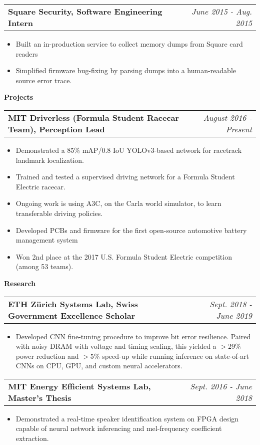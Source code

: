 \documentclass[letterpaper,11pt]{article}
\makeatletter
\newcommand{\resitem}[1]{\item[--] #1 \vspace{-4pt}}
\newcommand{\ressubheadingtwo}[2] {
\begin{tabular*}{7in}{l@{\extracolsep{\fill}}r}
	\textbf{#1} & \textit{#2} \\
\end{tabular*}\vspace{-6pt}}
\makeatother
\begin{document}
	\ressubheadingtwo{Square Security, Software Engineering Intern}{June 2015 - Aug. 2015}
	\begin{itemize}
            \itemsep0em
            \resitem{Built an in-production service to collect memory dumps from Square card readers}
            \resitem{Simplified firmware bug-fixing by parsing dumps into a human-readable source error trace.}
	\end{itemize}
    \vspace{0.05in}

\large \textbf{Projects\vspace{1mm}} \normalsize

    \ressubheadingtwo{MIT Driverless (Formula Student Racecar Team), Perception Lead}{August 2016 - Present}
    \begin{itemize}
        \itemsep0em
        \resitem{Demonstrated a 85\% mAP/0.8 IoU YOLOv3-based network for racetrack landmark localization.}
        \resitem{Trained and tested a supervised driving network for a Formula Student Electric racecar.}
        \resitem{Ongoing work is using A3C, on the Carla world simulator, to learn transferable driving policies.}
        \resitem{Developed PCBs and firmware for the first open-source automotive battery management system}
        \resitem{Won 2nd place at the 2017 U.S. Formula Student Electric competition (among 53 teams).}
    \end{itemize}

\large \textbf{Research \vspace{1mm}} \normalsize
    \vspace{0.02in}
    \ressubheadingtwo{ETH Z{\"u}rich Systems Lab, Swiss Government Excellence Scholar}{Sept. 2018 - June 2019}{}
	\begin{itemize}
    \vspace{-1mm}
            \itemsep0em
            \resitem{Developed CNN fine-tuning procedure to improve bit error resilience. Paired with noisy DRAM with voltage and timing scaling, this yielded a $>$29\% power reduction and $>$5\% speed-up while running inference on state-of-art CNNs on CPU, GPU, and custom neural accelerators.}
	\end{itemize}

	\ressubheadingtwo{MIT Energy Efficient Systems Lab, Master's Thesis}{Sept. 2016 - June 2018}{}
	\begin{itemize}
            \itemsep0em
            \resitem{Demonstrated a real-time speaker identification system on FPGA design capable of neural network inferencing and mel-frequency coefficient extraction.}
	\end{itemize}
\end{document}
